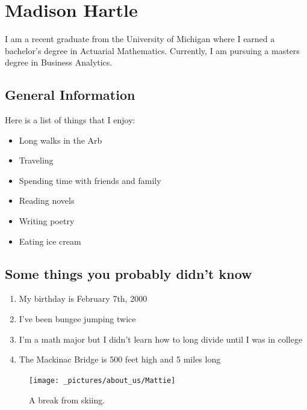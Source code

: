 \documentclass[
]{book}
\providecommand{\tightlist}{%
  \setlength{\itemsep}{0pt}\setlength{\parskip}{0pt}}
\begin{document}
\hypertarget{madison-hartle}{%
\section{Madison Hartle}\label{madison-hartle}}

I am a recent graduate from the University of Michigan where I earned a bachelor's degree in Actuarial Mathematics. Currently, I am pursuing a masters degree in Business Analytics.

\hypertarget{general-information}{%
\subsection{General Information}\label{general-information}}

Here is a list of things that I enjoy:

\begin{itemize}
\tightlist
\item
  Long walks in the Arb
\item
  Traveling
\item
  Spending time with friends and family
\item
  Reading novels
\item
  Writing poetry
\item
  Eating ice cream
\end{itemize}

\hypertarget{some-things-you-probably-didnt-know}{%
\subsection{Some things you probably didn't know}\label{some-things-you-probably-didnt-know}}

\begin{enumerate}
\def\labelenumi{\arabic{enumi}.}
\tightlist
\item
  My birthday is February 7th, 2000
\item
  I've been bungee jumping twice
\item
  I'm a math major but I didn't learn how to long divide until I was in college
\item
  The Mackinac Bridge is 500 feet high and 5 miles long
\end{enumerate}

\begin{figure}
\texttt{[image: \_pictures/about\_us/Mattie]} \caption{A break from skiing.}\label{fig:pic-Mattie}
\end{figure}
\end{document}

